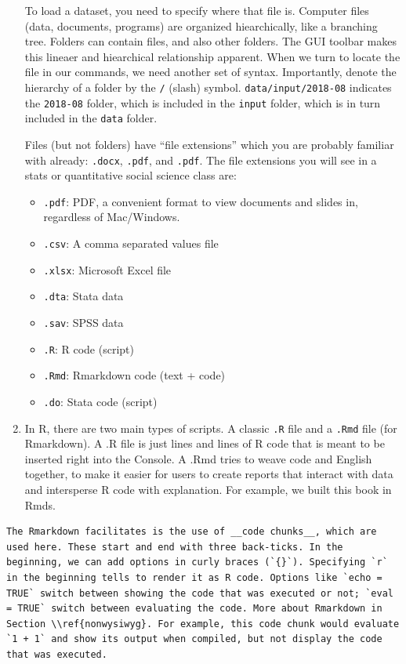 \documentclass[
]{book}
\theoremstyle{definition}
\theoremstyle{definition}
\theoremstyle{definition}
\theoremstyle{definition}
\theoremstyle{remark}
\begin{document}
\begin{enumerate}
  To load a dataset, you need to specify where that file is. Computer files (data, documents, programs) are organized hiearchically, like a branching tree. Folders can contain files, and also other folders. The GUI toolbar makes this lineaer and hiearchical relationship apparent. When we turn to locate the file in our commands, we need another set of syntax. Importantly, denote the hierarchy of a folder by the \texttt{/} (slash) symbol. \texttt{data/input/2018-08} indicates the \texttt{2018-08} folder, which is included in the \texttt{input} folder, which is in turn included in the \texttt{data} folder.

  Files (but not folders) have ``file extensions'' which you are probably familiar with already: \texttt{.docx}, \texttt{.pdf}, and \texttt{.pdf}. The file extensions you will see in a stats or quantitative social science class are:

  \begin{itemize}
  \item
    \texttt{.pdf}: PDF, a convenient format to view documents and slides in, regardless of Mac/Windows.
  \item
    \texttt{.csv}: A comma separated values file
  \item
    \texttt{.xlsx}: Microsoft Excel file
  \item
    \texttt{.dta}: Stata data
  \item
    \texttt{.sav}: SPSS data
  \item
    \texttt{.R}: R code (script)
  \item
    \texttt{.Rmd}: Rmarkdown code (text + code)
  \item
    \texttt{.do}: Stata code (script)
  \end{itemize}
\item
  In R, there are two main types of scripts. A classic \texttt{.R} file and a \texttt{.Rmd} file (for Rmarkdown). A .R file is just lines and lines of R code that is meant to be inserted right into the Console. A .Rmd tries to weave code and English together, to make it easier for users to create reports that interact with data and intersperse R code with explanation. For example, we built this book in Rmds.
\end{enumerate}

\begin{verbatim}
The Rmarkdown facilitates is the use of __code chunks__, which are used here. These start and end with three back-ticks. In the beginning, we can add options in curly braces (`{}`). Specifying `r` in the beginning tells to render it as R code. Options like `echo = TRUE` switch between showing the code that was executed or not; `eval = TRUE` switch between evaluating the code. More about Rmarkdown in Section \\ref{nonwysiwyg}. For example, this code chunk would evaluate `1 + 1` and show its output when compiled, but not display the code that was executed.
\end{verbatim}
\end{document}
